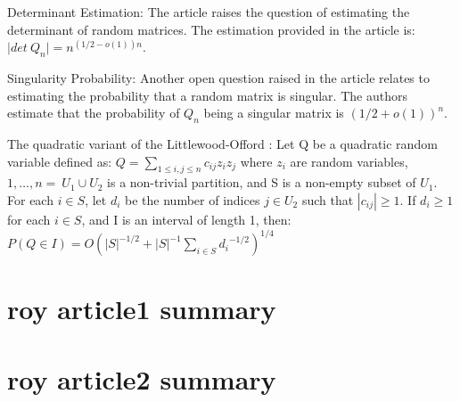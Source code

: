 \documentclass[12pt]{article}
\begin{document}
Determinant Estimation: The article raises the question of estimating the 
determinant of random matrices. The estimation provided in the article is: $ |det\ {Q_n|=}n^{\left(1/2-o\left(1\right)\right)n} $.

Singularity Probability: Another open question raised in the article relates to estimating the 
probability that a random matrix is singular. The authors estimate that
the probability of $ Q_n $ being a singular matrix is $ {(1/2+o\left(1\right))}^n $.

The quadratic variant of the Littlewood-Offord :
Let Q be a quadratic random variable defined as: $ Q=\sum_{1\le i,j\le n}{c_{ij}z_iz_j} $  where $ z_i $
are random variables, $ {1,\ldots,n}=\ U_1\cup U_2  $
is a non-trivial partition, and S is a non-empty subset of
$ U_1 $. For each $ i\in S $, let  $d_i$  be the number of indices  $j\in U_2$ 
such that $|c_{ij}|\geq1$. If 
$ d_i\geq1$ for each $i\in S$, and I is an interval of length 1, then:
$ P\left(Q\in I\right)=O{({|S|}^{-1/2}+{|S|}^{-1}\sum_{i\in S}{d_i}^{-1/2})}^{1/4} $


\section{roy article1 summary}

\section{roy article2 summary}
\end{document}
